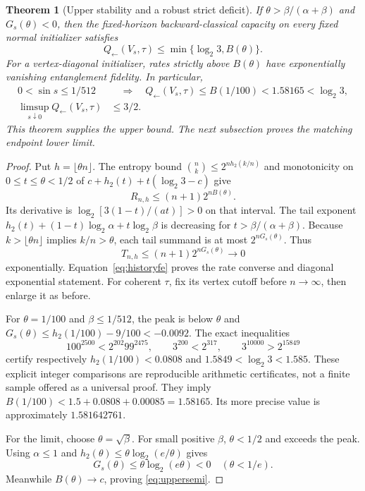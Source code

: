\documentclass[11pt]{article}
\newtheorem{theorem}{Theorem}[section]
\begin{document}
\begin{theorem}[Upper stability and a robust strict deficit]\label{thm:stability}
If $\theta>\beta/(\alpha+\beta)$ and $G_s(\theta)<0$, then the fixed-horizon backward-classical capacity on every fixed normal initializer satisfies
\begin{equation}
 Q_{\leftarrow}(V_s,\tau)\le\min\{\log_2 3,B(\theta)\}.\label{eq:Qperturb}
\end{equation}
For a vertex-diagonal initializer, rates strictly above $B(\theta)$ have exponentially vanishing entanglement fidelity. In particular,
\begin{align}
 0<\sin s\le1/512&\quad\Longrightarrow\quad
 Q_{\leftarrow}(V_s,\tau)\le B(1/100)<1.58165<\log_2 3,\label{eq:explicitstable}\\
 \limsup_{s\downarrow0}Q_{\leftarrow}(V_s,\tau)&\le3/2.\label{eq:uppersemi}
\end{align}
This theorem supplies the upper bound. The next subsection proves the matching endpoint lower limit.
\end{theorem}
\begin{proof}
Put $h=\lfloor\theta n\rfloor$. The entropy bound $\binom nk\le2^{nh_2(k/n)}$ and monotonicity on $0\le t\le\theta<1/2$ of
$c+h_2(t)+t(\log_2 3-c)$ give
\[
 R_{n,h}\le(n+1)2^{nB(\theta)}.
\]
Its derivative is $\log_2[3(1-t)/(at)]>0$ on that interval. The tail exponent $h_2(t)+(1-t)\log_2\alpha+t\log_2\beta$ is decreasing for $t>\beta/(\alpha+\beta)$. Because $k>\lfloor\theta n\rfloor$ implies $k/n>\theta$, each tail summand is at most $2^{nG_s(\theta)}$. Thus
\[
 T_{n,h}\le(n+1)2^{nG_s(\theta)}\longrightarrow0
\]
exponentially. Equation~\eqref{eq:historyfe} proves the rate converse and diagonal exponential statement. For coherent $\tau$, fix its vertex cutoff before $n\to\infty$, then enlarge it as before.

For $\theta=1/100$ and $\beta\le1/512$, the peak is below $\theta$ and
$G_s(\theta)\le h_2(1/100)-9/100<-0.0092$.
The exact inequalities
\[
 100^{2500}<2^{202}99^{2475},\qquad
 3^{200}<2^{317},\qquad 3^{10000}>2^{15849}
\]
certify respectively $h_2(1/100)<0.0808$ and $1.5849<\log_2 3<1.585$. These explicit integer comparisons are reproducible arithmetic certificates, not a finite sample offered as a universal proof. They imply
$B(1/100)<1.5+0.0808+0.00085=1.58165$.
Its more precise value is approximately $1.581642761$.

For the limit, choose $\theta=\sqrt\beta$. For small positive $\beta$, $\theta<1/2$ and exceeds the peak. Using $\alpha\le1$ and $h_2(\theta)\le\theta\log_2(e/\theta)$ gives
\[
 G_s(\theta)\le\theta\log_2(e\theta)<0\quad(\theta<1/e).
\]
Meanwhile $B(\theta)\to c$, proving \eqref{eq:uppersemi}.
\end{proof}
\end{document}
